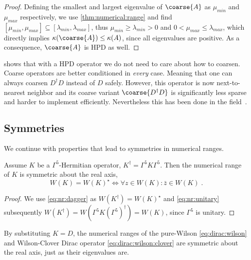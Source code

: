 \begin{proof}
Defining the smallest and largest eigenvalue of $\coarse{A}$ as $\mu_{min}$ and $\mu_{max}$ respectively, we use \cref{thm:numerical:range} and find $[ \mu_{min}, \mu_{max}] \subseteq [ \lambda_{min}, \lambda_{max} ]$, thus $\mu_{min} \geq \lambda_{min} > 0$ and $0 < \mu_{max} \leq \lambda_{max}$, which directly implies $\kappa(\coarse{A}) \leq \kappa(A)$, since all eigenvalues are positive. As a consequence, $\coarse{A}$ is HPD as well.
\end{proof}

 shows that with a HPD operator we do not need to care about how to coarsen.
Coarse operators are better conditioned in \emph{every} case.
Meaning that one can always coarsen $D^{\dagger} D$ instead of $D$ safely.
However, this operator is now next-to-nearest neighbor and its coarse variant $\coarse{D^{\dagger} D}$ is significantly less sparse and harder to implement efficiently.
Nevertheless this has been done in the field~\cite{Cohen:2011ivh,Boyle:2014rwa}.

\subsection{Symmetries}

We continue with properties that lead to symmetries in numerical ranges.

\begin{lemma} \label{lemma:nr:xsym}
Assume $K$ be a $\Gamma^{5}$-Hermitian operator, \ie $K^{\dagger} = \Gamma^{5} K \Gamma^{5}$.
Then the numerical range of $K$ is symmetric about the real axis,
\begin{equation}
W(K) = W(K)^{\star} \iff \forall z \in W(K) \colon \bar{z} \in W(K) \;.
\end{equation}
\end{lemma}

\begin{proof}
We use \cref{eq:nr:dagger} as $W(K^{\dagger}) = W(K)^{\star}$ and \cref{eq:nr:unitary} subsequently $W(K^{\dagger}) = W(\Gamma^{5} K (\Gamma^{5})^{\dagger}) = W(K)$, since $\Gamma^{5}$ is unitary.
\end{proof}

By substituting $K=D$, the numerical ranges of the pure-Wilson \cref{eq:dirac:wilson} and Wilson-Clover Dirac operator \cref{eq:dirac:wilson:clover} are symmetric about the real axis, just as their eigenvalues are.

